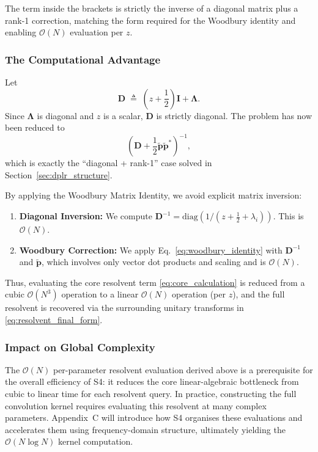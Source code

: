 \documentclass[a4paper,11pt]{article}
\begin{document}
The term inside the brackets is strictly the inverse of a diagonal matrix plus a rank-1 correction, matching the form required for the Woodbury identity and enabling $\mathcal{O}(N)$ evaluation per $z$.

\subsubsection{The Computational Advantage}
Let
\begin{equation}
\mathbf{D} \;\triangleq\; \left(z+\frac{1}{2}\right)\mathbf{I}+\mathbf{\Lambda}.
\end{equation}
Since $\mathbf{\Lambda}$ is diagonal and $z$ is a scalar, $\mathbf{D}$ is strictly diagonal. The problem has now been reduced to
\begin{equation}\label{eq:woodbury_target_here}
\left(\mathbf{D} + \frac{1}{2}\tilde{\mathbf{p}}\tilde{\mathbf{p}}^*\right)^{-1},
\end{equation}
which is exactly the ``diagonal + rank-1'' case solved in Section~\ref{sec:dplr_structure}.

By applying the Woodbury Matrix Identity, we avoid explicit matrix inversion:
\begin{enumerate}
    \item \textbf{Diagonal Inversion:} We compute $\mathbf{D}^{-1}=\mathrm{diag}\!\left(1/\left(z+\frac{1}{2}+\lambda_i\right)\right)$. This is $\mathcal{O}(N)$.
    \item \textbf{Woodbury Correction:} We apply Eq.~\eqref{eq:woodbury_identity} with $\mathbf{D}^{-1}$ and $\tilde{\mathbf{p}}$, which involves only vector dot products and scaling and is $\mathcal{O}(N)$.
\end{enumerate}

Thus, evaluating the core resolvent term \eqref{eq:core_calculation} is reduced from a cubic $\mathcal{O}(N^3)$ operation to a linear $\mathcal{O}(N)$ operation (per $z$), and the full resolvent is recovered via the surrounding unitary transforms in \eqref{eq:resolvent_final_form}.

\subsubsection{Impact on Global Complexity}
The $\mathcal{O}(N)$ per-parameter resolvent evaluation derived above is a prerequisite for the overall efficiency of S4: it reduces the core linear-algebraic bottleneck from cubic to linear time for each resolvent query.
In practice, constructing the full convolution kernel requires evaluating this resolvent at many complex parameters. Appendix~C will introduce how S4 organises these evaluations and accelerates them using frequency-domain structure, ultimately yielding the $\mathcal{O}(N\log N)$ kernel computation.
\end{document}
